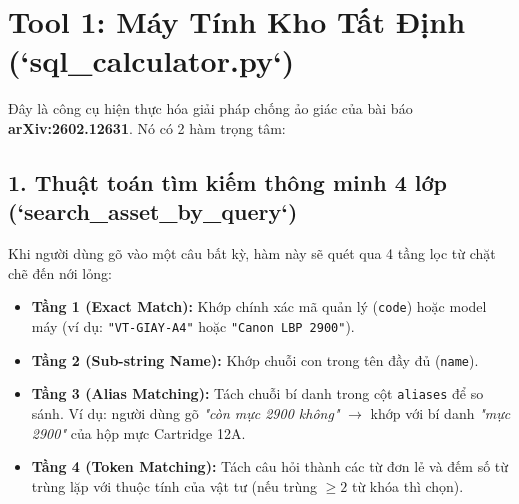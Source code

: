 \documentclass[11pt,a4paper]{article}
\begin{document}
\section{Tool 1: Máy Tính Kho Tất Định (`sql\_calculator.py`)}

Đây là công cụ hiện thực hóa giải pháp chống ảo giác của bài báo \textbf{arXiv:2602.12631}. Nó có 2 hàm trọng tâm:

\subsection{1. Thuật toán tìm kiếm thông minh 4 lớp (`search\_asset\_by\_query`)}
Khi người dùng gõ vào một câu bất kỳ, hàm này sẽ quét qua 4 tầng lọc từ chặt chẽ đến nới lỏng:
\begin{itemize}
    \item \textbf{Tầng 1 (Exact Match):} Khớp chính xác mã quản lý (\texttt{code}) hoặc model máy (ví dụ: \texttt{"VT-GIAY-A4"} hoặc \texttt{"Canon LBP 2900"}).
    \item \textbf{Tầng 2 (Sub-string Name):} Khớp chuỗi con trong tên đầy đủ (\texttt{name}).
    \item \textbf{Tầng 3 (Alias Matching):} Tách chuỗi bí danh trong cột \texttt{aliases} để so sánh. Ví dụ: người dùng gõ \textit{"còn mực 2900 không"} $\rightarrow$ khớp với bí danh \textit{"mực 2900"} của hộp mực Cartridge 12A.
    \item \textbf{Tầng 4 (Token Matching):} Tách câu hỏi thành các từ đơn lẻ và đếm số từ trùng lặp với thuộc tính của vật tư (nếu trùng $\ge 2$ từ khóa thì chọn).
\end{itemize}
\end{document}
